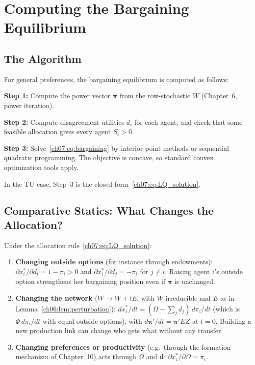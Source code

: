 \documentclass[../structural_economics_book.tex]{subfiles}
\begin{document}
\section{Computing the Bargaining Equilibrium}
\label{ch07:sec:computation}

\subsection{The Algorithm}

For general preferences, the bargaining equilibrium is computed as follows:

\textbf{Step 1:} Compute the power vector $\boldsymbol{\pi}$ from the row-stochastic $W$ (Chapter~6, power iteration).

\textbf{Step 2:} Compute disagreement utilities $d_i$ for each agent, and check that some feasible allocation gives every agent $S_i > 0$.

\textbf{Step 3:} Solve~\eqref{ch07:eq:bargaining} by interior-point methods or sequential quadratic programming. The objective is concave, so standard convex optimization tools apply.

In the TU case, Step~3 is the closed form~\eqref{ch07:eq:LQ_solution}.


\subsection{Comparative Statics: What Changes the Allocation?}

\begin{proposition}\label{ch07:prop:comp_statics}
Under the allocation rule~\eqref{ch07:eq:LQ_solution}:
\begin{enumerate}
\item \textbf{Changing outside options} (for instance through endowments): $\partial x_i^*/\partial d_i = 1 - \pi_i > 0$ and $\partial x_i^*/\partial d_j = -\pi_i$ for $j \neq i$. Raising agent $i$'s outside option strengthens her bargaining position even if $\boldsymbol{\pi}$ is unchanged.

\item \textbf{Changing the network} ($W \to W + t E$, with $W$ irreducible and $E$ as in Lemma~\ref{ch06:lem:perturbation}): $dx_i^*/dt = (\Omega - \sum_j d_j)\, d\pi_i/dt$ (which is $\Phi\, d\pi_i/dt$ with equal outside options), with $d\boldsymbol{\pi}'/dt = \boldsymbol{\pi}'EZ$ at $t = 0$. Building a new production link can change who gets what without any transfer.

\item \textbf{Changing preferences or productivity} (e.g.\ through the formation mechanism of Chapter~10) acts through $\Omega$ and $\boldsymbol{d}$: $\partial x_i^*/\partial \Omega = \pi_i$.
\end{enumerate}
\end{proposition}
\end{document}
